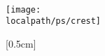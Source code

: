 \begin{titlepage}
\begin{center}
\vspace*{1.0cm}
\Huge
{\bf \xtitle}\\
\vspace*{2.5cm}
{\Large \bf
\xauthor\\
\xcollege\\
}
\vspace*{2.5cm}
\centerline{
\texttt{[image: \\localpath/ps/crest]}
}
\vspace*{1.5cm}
\normalsize

[0.5cm]
{\bf \xterm}\\

\vspace{2cm}

\end{center}
\end{titlepage}

